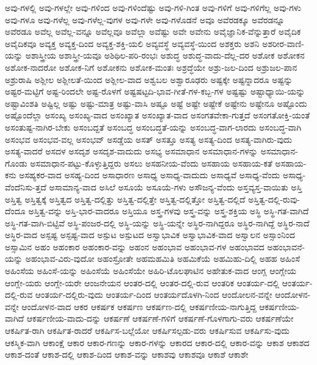 {ಅವು-ಗಳಲ್ಲಿ
ಅವು-ಗಳಲ್ಲೇ
ಅವು-ಗಳಿಂದ
ಅವು-ಗಳಿಂದೆಷ್ಟು
ಅವು-ಗಳಿ-ಗಿಂತ
ಅವು-ಗಳಿಗೆ
ಅವು-ಗಳಿಗೆಲ್ಲ
ಅವು-ಗಳು
ಅವು-ಗಳೂ
ಅವು-ಗಳೆಲ್ಲ
ಅವು-ಗಳೆಲ್ಲ-ವುಗಳ
ಅವು-ಗಳೇ
ಅವು-ಗಳೊಡನೆ
ಅವೂ
ಅವೆರಡಕ್ಕೂ
ಅವೆರಡನ್ನೂ
ಅವೆರಡೂ
ಅವೆಲ್ಲ
ಅವೆಲ್ಲ-ವನ್ನೂ
ಅವೆಲ್ಲವೂ
ಅವೆಲ್ಲಾ
ಅವೆಷ್ಟು
ಅವೇ
ಅವೇನು
ಅವೈಜ್ಞಾನಿಕ-ವೆನ್ನುತ್ತಾರೆ
ಅವೈದಿಕ
ಅವೈದಿಕವೂ
ಅವ್ಯಕ್ತ
ಅವ್ಯಕ್ತ-ದಿಂದ
ಅವ್ಯಕ್ತ-ಶಕ್ತಿ-ಯಲಿ
ಅವ್ಯವಸ್ಥೆ
ಅವ್ಯವಸ್ಥೆ-ಯಿಂದ
ಅಶಕ್ತರು
ಅಶನಿ
ಅಶರೀರ-ವಾಣಿ-ಯನ್ನು
ಅಶಾಸ್ತ್ರೀಯ
ಅಶಾಸ್ತ್ರೀ-ಯವೂ
ಅಶಿಥಿಲ-ಪರಿ-ರಂಭಃ
ಅಶುದ್ಧ
ಅಶುದ್ಧ-ವಾದು-ದೆಲ್ಲ-ದರ
ಅಶೋಕ
ಅಶೋಕನ
ಅಶೋಕ-ನಾದರೋ
ಅಶೋಕ-ನಿಗೆ
ಅಶೋಕನು
ಅಶೋಕ-ಮಂತಃ
ಅಶ್ರದ್ಧೆಯೇ
ಅಶ್ರು-ಜಲ-ದಿಂದ
ಅಶ್ರುಜಲ-ಪಾನ
ಅಶ್ರುರಾಷಿ
ಅಶ್ಲೀಲ
ಅಶ್ಲೀಲತೆ-ಯಿಂದ
ಅಶ್ಲೀಲ-ವಾದ
ಅಶ್ವಬಲ
ಅಶ್ವಾರೂಢರು
ಅಷ್ಟಕ್ಕೇ
ಅಷ್ಟನ್ನಾದರೂ
ಅಷ್ಟನ್ನು
ಅಷ್ಟರ-ಮಟ್ಟಿಗೆ
ಅಷ್ಟ-ರಿಂದಲೇ
ಅಷ್ಟ-ರೊಳಗೆ
ಅಷ್ಟಷಟ್ಟದಿ-ಭಾವ-ಗೀತೆ-ಗಳ-ಕಬ್ಬ-ಗಳ
ಅಷ್ಟಷ್ಟು
ಅಷ್ಟಾಧ್ಯಾಯಿ-ಯನ್ನು
ಅಷ್ಟಾವಿಂಶತಿ
ಅಷ್ಟಿಲ್ಲ
ಅಷ್ಟು
ಅಷ್ಟು-ಮಾತ್ರ
ಅಷ್ಟು-ವಾಸಿ
ಅಷ್ಟೂ
ಅಷ್ಟೆ
ಅಷ್ಟೇ
ಅಷ್ಟೇಕೆ
ಅಷ್ಟೇನು
ಅಷ್ಟೇನೂ
ಅಷ್ಟೊಂದು
ಅಷ್ಟೊಂದೆಲ್ಲಾ
ಅಸಂಖ್ಯ
ಅಸಂಖ್ಯ-ವಾದ
ಅಸಂಖ್ಯಾತ
ಅಸಂಖ್ಯಾತ-ವಾದ
ಅಸಂಗತವೇಕಾ-ಗುತ್ತದೆ
ಅಸಂಗತೋಕ್ತಿ-ಯಂತೆ
ಅಸಂತುಷ್ಟ-ನಾಗಿರ-ಬೇಕು
ಅಸಂಬದ್ದತೆ
ಅಸಂಬದ್ಧ
ಅಸಂಬದ್ಧತೆ-ಯನ್ನು
ಅಸಂಬದ್ಧ-ವಾಗ-ಲಾರದು
ಅಸಂಬದ್ಧ-ವಾಗಿ
ಅಸಂಭವ
ಅಸಂಭವ-ವಲ್ಲ
ಅಸಂಭವ್
ಅಸಡ್ಡೆಯ
ಅಸತ್
ಅಸತ್ತೂ
ಅಸತ್ಯ
ಅಸತ್ಯ-ದಿಂದ
ಅಸತ್ಯ-ವಾಗಿರು-ವುದು
ಅಸತ್ಯ-ವಾದರೆ
ಅಸದಳ
ಅಸದೃಶ
ಅಸದೃಶ-ವಾದುದು
ಅಸಭ್ಯ
ಅಸಮಾಧಾನ
ಅಸಮಾಧಾನ-ಗಳನ್ನು
ಅಸಮಾಧಾನ-ಗೊಂಡು
ಅಸಮಾಧಾನ-ಪಟ್ಟು-ಕೊಳ್ಳುತ್ತಿದ್ದರು
ಅಸಲು
ಅಸಹನೀಯ-ವೆಂದು
ಅಸಹಾಯ
ಅಸಹಾಯ-ಕತೆ
ಅಸಹಾಯ-ಕನು
ಅಸಹ್ಯಕರ-ವಾದ
ಅಸಹ್ಯ-ದಿಂದ
ಅಸಾಧಾರಣ
ಅಸಾಧ್ಯ
ಅಸಾಧ್ಯ-ವಾದುದು
ಅಸಾಧ್ಯವೆ
ಅಸಾಧ್ಯ-ವೆಂದು
ಅಸಾಧ್ಯ-ವೆಂದೆನಿಸು-ತ್ತದೆ
ಅಸಾಮಾನ್ಯ-ವಾದ
ಅಸಿಲೆ
ಅಸೂಯೆ
ಅಸೂಯೆ-ಗಳು
ಅಸೌಜನ್ಯ-ವೆಂದು
ಅಸ್ತವ್ಯಸ್ತ-ವಾಯಿತು
ಅಸ್ತಿ
ಅಸ್ತಿತ್ವ
ಅಸ್ತಿತ್ವಕ್ಕೆ
ಅಸ್ತಿತ್ವದ
ಅಸ್ತಿತ್ವ-ದಲ್ಲಿತ್ತು
ಅಸ್ತಿತ್ವ-ದಲ್ಲಿತ್ತೇ
ಅಸ್ತಿತ್ವ-ದಲ್ಲಿತ್ತೋ
ಅಸ್ತಿತ್ವ-ದಲ್ಲಿದೆ
ಅಸ್ತಿತ್ವ-ದಲ್ಲಿ-ರುವು-ದೆಂದೂ
ಅಸ್ತಿತ್ವ-ವನ್ನು
ಅಸ್ತಿ-ಭಾರ-ವಾದರೂ
ಅಸ್ತಿಯೂ
ಅಸ್ತ್ರ-ಗಳವು
ಅಸ್ತ್ರ-ವನ್ನು
ಅಸ್ತ್ರ-ಶಕ್ತಿಯ
ಅಸ್ಥಿ
ಅಸ್ಥಿ-ಗತ-ವಾಗಿದೆ
ಅಸ್ಥಿ-ಗತ-ವಾಗಿ-ಬಿಟ್ಟಿವೆ
ಅಸ್ಥಿ-ಪಂಜರ-ದಲ್ಲಿ
ಅಸ್ಥಿ-ಯನ್ನು
ಅಸ್ಥಿ-ಯನ್ನೇ
ಅಸ್ಥಿರ-ನಾಗಿದ್ದರೂ
ಅಸ್ಥಿರ-ನಾಗಿದ್ದೆ
ಅಸ್ಥಿರ-ನಾದೆ
ಅಸ್ಥಿರ-ವಾದ
ಅಸ್ಪಷ್ಟ
ಅಸ್ಪಷ್ಟ-ವಾದ
ಅಸ್ಪುಟ
ಅಸ್ಪುಟದ
ಅಸ್ವಾಭಾವಿಕ
ಅಸ್ವಾಭಾವಿಕ-ವಾದ
ಅಸ್ವಾಲನ
ಅಸ್ಸಾಂನಿಂದ
ಅಸ್ಸಾಮಿನ
ಅಹಂ
ಅಹಂಕಾರ
ಅಹಂಕಾರ-ವನ್ನು
ಅಹಂನ
ಅಹಂಭಾವ
ಅಹಂಭಾವ-ಗಳ
ಅಹಂಭಾವದ
ಅಹಂಭಾವನೆ-ಯನ್ನು
ಅಹಂಭಾವ-ವಿರು-ವುದೋ
ಅಹಂಸ್ರೋತೇ
ಅಹಮಹಮಿತಿ
ಅಹಮಿಕೆಯೆ
ಅಹಮಿಹು-ದಿಲ್ಲಿ
ಅಹಹ
ಅಹಿಂಸೆ
ಅಹಿಂಸೆಯ
ಅಹಿಂಸೆ-ಯನ್ನು
ಅಹಿಂಸೆಯೆ
ಅಹಿಂಸೆಯೇ
ಅಹಿರಿ-ಟೊಲಘಾಟಿನ
ಅಹೇತುಕ-ವಾದ
ಆಂಗ್ಲ
ಆಂಗ್ಲೇಯ
ಆಂಗ್ಲೇ-ಯರು
ಆಂಗ್ಲೇ-ಯರೇ
ಆಂಜನೇಯನ
ಆಂತರ-ದಲ್ಲಿ
ಆಂತರ-ದಲ್ಲಿ-ರುವ
ಆಂತರಿಕ
ಆಂತರ್ಯ-ದಲ್ಲಿ
ಆಂತರ್ಯ-ದಲ್ಲಿ-ರುವ
ಆಂತರ್ಯ-ದಲ್ಲಿರು-ವುದು
ಆಂತರ್ಯ-ದಿಂದ
ಆಂತರ್ಯದೊಳಗಿ-ನಿಂದ
ಆಂದೋಲನ-ವನ್ನೇ
ಆಂದೋಳನ-ವನ್ನೇ
ಆಂದೋಳನ-ವಾದ
ಆಕರ
ಆಕರ್ಷಕ
ಆಕರ್ಷಣ
ಆಕರ್ಷಣ-ದಲ್ಲಿ
ಆಕರ್ಷಣೀಯ-ನಾಗುತ್ತಿದ್ದ
ಆಕರ್ಷಣೀಯ-ವಾಗಿದೆ
ಆಕರ್ಷಣೀಯ-ವಾದು-ದನ್ನು
ಆಕರ್ಷಣೆ
ಆಕರ್ಷಣೆ-ಗಳಿಗೆ
ಆಕರ್ಷಣೆ-ಗೊಳಗಾಗು-ವರು
ಆಕರ್ಷಣೆಯೇ
ಆಕರ್ಷಿತ-ರಾಗಿ
ಆಕರ್ಷಿತ-ರಾದರೆ
ಆಕರ್ಷಿಸ-ಬಲ್ಲೆಯೋ
ಆಕರ್ಷಿಸಲ್ಪಡು-ವರು
ಆಕರ್ಷಿಸುವ
ಆಕರ್ಷಿಸು-ವುದು
ಆಕಸ್ಮಿಕ-ವಾಗಿ
ಆಕಾಂಕ್ಷೆ
ಆಕಾರ
ಆಕಾರ-ಗಣನ್ನು
ಆಕಾರ-ಗಳನ್ನು
ಆಕಾರದ
ಆಕಾರ-ದಲ್ಲಿ
ಆಕಾರ-ವನ್ನು
ಆಕಾಶ
ಆಕಾಶದ
ಆಕಾಶ-ದಂತೆ
ಆಕಾಶ-ದಲ್ಲಿ
ಆಕಾಶ-ದಿಂದ
ಆಕಾಶ-ವನ್ನು
ಆಕಾಶವು
ಆಕಾಶವೂ
ಆಕಾಶೆ
ಆಕಾಶೇ
}
